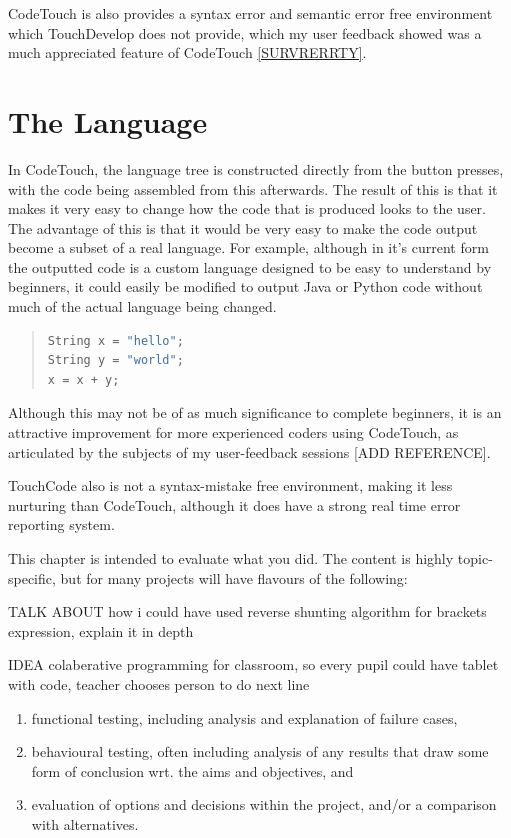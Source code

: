 \documentclass[ %
                    author={Jonathan Rankin},
                supervisor={Dr. David May, Dr. Ian Holyer},
                    degree={MEng},
                     title={CodeTouch},
                  subtitle={A Revolutionary Way To Program Real Code On Touch Screen Devices},
                      type={enterprise},
                      year={2015 } ]{dissertation}
\begin{document}
CodeTouch is also provides a syntax error and semantic error free environment which TouchDevelop does not provide, which my user feedback showed was a much appreciated feature of CodeTouch \ref{SURVRERRTY}.

\section{The Language}
In CodeTouch, the language tree is constructed directly from the button presses, with the code being assembled from this afterwards. The result of this is that it makes it very easy to change how the code that is produced looks to the user. The advantage of this is that it would be very easy to make the code output become a subset of a real language. For example, although in it's current form the outputted code is a custom language designed to be easy to understand by beginners, it could easily be modified to output Java or Python code without much of the actual language being changed.

\begin{quote}
\begin{lstlisting}[label={lst:python},language=Python]
String x = "hello";
String y = "world";
x = x + y;
\end{lstlisting}
\label{lst:label}
\end{quote}

Although this may not be of as much significance to complete beginners, it is an attractive improvement for more experienced coders using CodeTouch, as articulated by the subjects of my user-feedback sessions [ADD REFERENCE].

TouchCode also is not a syntax-mistake free environment, making it less nurturing than CodeTouch, although it does have a strong real time error reporting system.








This chapter is intended to evaluate what you did.  The content is highly 
topic-specific, but for many projects will have flavours of the following:

TALK ABOUT how i could have used reverse shunting algorithm for brackets expression, explain it in depth

IDEA colaberative programming for classroom, so every pupil could have tablet with code, teacher chooses person to do next line

\begin{enumerate}
\item functional  testing, including analysis and explanation of failure 
      cases,
\item behavioural testing, often including analysis of any results that 
      draw some form of conclusion wrt. the aims and objectives,
      and
\item evaluation of options and decisions within the project, and/or a
      comparison with alternatives.
\end{enumerate}
\end{document}
